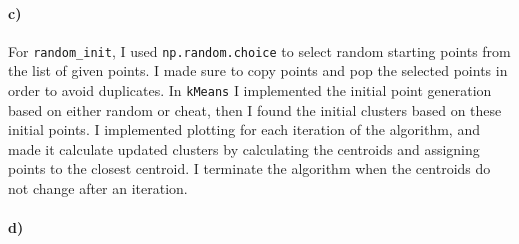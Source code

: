 \documentclass[12pt]{article}
\begin{document}
\paragraph{c)}

For \texttt{random\_init}, I used \texttt{np.random.choice} to select random starting points from the list of given points. I made sure to copy points and pop
the selected points in order to avoid duplicates. In \texttt{kMeans} I implemented the initial point generation based on either random or cheat, then I
found the initial clusters based on these initial points. I implemented plotting for each iteration of the algorithm, and made it calculate updated clusters
by calculating the centroids and assigning points to the closest centroid. I terminate the algorithm when the centroids do not change after an iteration.

\paragraph{d)}
\end{document}
